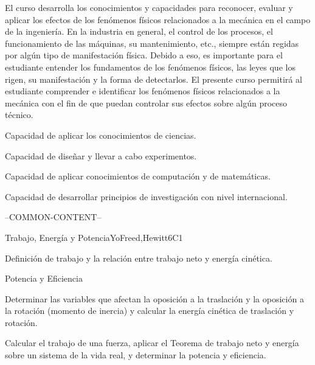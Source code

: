 \begin{syllabus}


\begin{justification}
   El curso desarrolla los conocimientos y capacidades para reconocer, evaluar y aplicar los efectos de los fenómenos físicos relacionados a la mecánica en el campo de la ingeniería. En la industria en general, el control de los procesos, el funcionamiento de las máquinas, su mantenimiento, etc., siempre están regidas por algún tipo de manifestación física. Debido a eso, es importante para el estudiante entender los fundamentos de los fenómenos físicos, las leyes que los rigen, su manifestación y la forma de detectarlos. El presente curso permitirá al estudiante comprender e identificar los fenómenos físicos relacionados a la mecánica con el fin de que puedan controlar sus efectos sobre algún proceso técnico. 
\end{justification}

\begin{goals}
\item Capacidad de aplicar los conocimientos de ciencias.
\item Capacidad de diseñar y llevar a cabo experimentos.
\item Capacidad de aplicar conocimientos de computación y de matemáticas.
\item Capacidad de desarrollar principios de investigación con nivel internacional.
\end{goals}

--COMMON-CONTENT--

\begin{unit}{Trabajo, Energía y Potencia}{}{YoFreed,Hewitt}{6}{C1}
   \begin{topics}
      \item Definición de trabajo y la relación entre trabajo neto y energía cinética.
      \item Potencia y Eficiencia
   \end{topics}

   \begin{learningoutcomes}
      \item Determinar las variables que afectan la oposición a la traslación y la oposición a la rotación (momento de inercia) y calcular la energía cinética de traslación y rotación.
      \item Calcular el trabajo de una fuerza, aplicar el Teorema de trabajo neto y energía sobre un sistema de la vida real, y determinar la potencia y eficiencia.
   \end{learningoutcomes}
\end{unit}


\end{syllabus}
